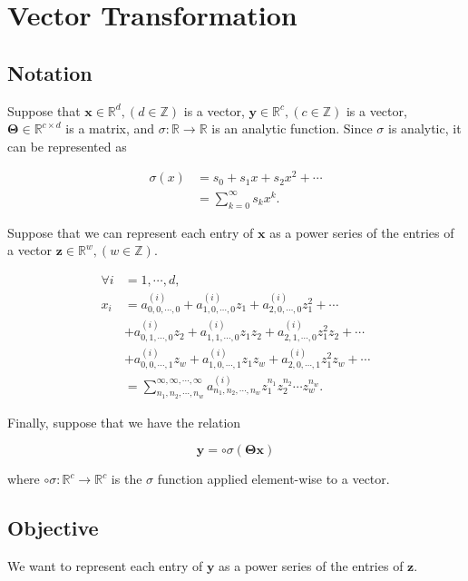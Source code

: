 \section{Vector Transformation}
\subsection{Notation}

Suppose that $\mathbf{x} \in \mathbb{R}^d, (d \in \mathbb{Z})$ is a vector, $\mathbf{y} \in \mathbb{R}^c, (c \in \mathbb{Z})$ is a vector, $\mathbf{\Theta} \in \mathbb{R}^{c \times d}$ is a matrix, and $\sigma: \mathbb{R} \to \mathbb{R}$ is an analytic function. Since $\sigma$ is analytic, it can be represented as

\begin{align*}
    \sigma(x)
    &= s_0 + s_1 x + s_2 x^2 + \cdots \\
    &= \sum_{k=0}^{\infty} s_{k} x^{k}.
\end{align*}

Suppose that we can represent each entry of $\mathbf{x}$ as a power series of the entries of a vector $\mathbf{z} \in \mathbb{R}^{w}, (w \in \mathbb{Z})$.

\begin{align*}
    \forall i &= 1, \cdots, d, \\ x_i
    &= a^{(i)}_{0,0,\cdots,0} + a^{(i)}_{1,0,\cdots,0} z_1 + a^{(i)}_{2,0,\cdots,0} z_1^2 + \cdots \\
    &+ a^{(i)}_{0,1,\cdots,0} z_2 + a^{(i)}_{1,1,\cdots,0} z_1 z_2 + a^{(i)}_{2,1,\cdots,0} z_1^2 z_2 + \cdots \\
    &+ a^{(i)}_{0,0,\cdots,1} z_w + a^{(i)}_{1,0,\cdots,1} z_1 z_w + a^{(i)}_{2,0,\cdots,1} z_1^2 z_w + \cdots \\
    &= \sum_{n_1,n_2,\cdots,n_w}^{\infty,\infty,\cdots,\infty} a^{(i)}_{n_1,n_2,\cdots,n_w} z_1^{n_1} z_2^{n_2} \cdots z_w^{n_w}.
\end{align*}

Finally, suppose that we have the relation

\begin{equation*}
    \mathbf{y} = \circ\sigma(\mathbf{\Theta} \mathbf{x})
\end{equation*}

where $\circ\sigma: \mathbb{R}^{c} \to \mathbb{R}^{c}$ is the $\sigma$ function applied element-wise to a vector.

\subsection{Objective}
We want to represent each entry of $\mathbf{y}$ as a power series of the entries of $\mathbf{z}$.

